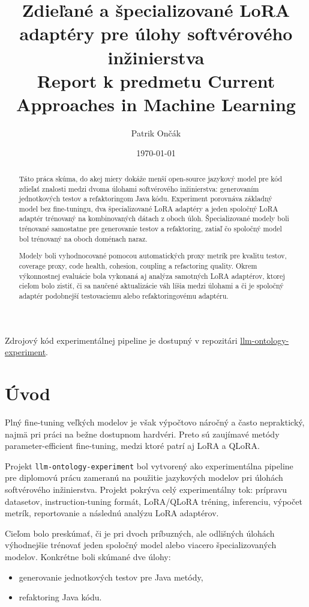 \documentclass[11pt,a4paper]{article}
\title{
\textbf{Zdieľané a špecializované LoRA adaptéry pre úlohy softvérového inžinierstva}\\
\large Report k predmetu Current Approaches in Machine Learning
}
\author{Patrik Ončák}
\date{\today}
\newcommand{\projectname}{\texttt{llm-ontology-experiment}}
\begin{document}
\maketitle

\begin{abstract}
Táto práca skúma, do akej miery dokáže menší open-source jazykový model pre kód zdieľať znalosti medzi dvoma úlohami softvérového inžinierstva: generovaním jednotkových testov a refaktoringom Java kódu. Experiment porovnáva základný model bez fine-tuningu, dva špecializované LoRA adaptéry a jeden spoločný LoRA adaptér trénovaný na kombinovaných dátach z oboch úloh. Špecializované modely boli trénované samostatne pre generovanie testov a refaktoring, zatiaľ čo spoločný model bol trénovaný na oboch doménach naraz.

Modely boli vyhodnocované pomocou automatických proxy metrík pre kvalitu testov, coverage proxy, code health, cohesion, coupling a refactoring quality. Okrem výkonnostnej evaluácie bola vykonaná aj analýza samotných LoRA adaptérov, ktorej cieľom bolo zistiť, či sa naučené aktualizácie váh líšia medzi úlohami a či je spoločný adaptér podobnejší testovaciemu alebo refaktoringovému adaptéru.
\end{abstract}

Zdrojový kód experimentálnej pipeline je dostupný v repozitári
\href{https://github.com/patrik-on/llm-ontology-experiment}{llm-ontology-experiment}.

\section{Úvod}

Plný fine-tuning veľkých modelov je však výpočtovo náročný a často nepraktický, najmä pri práci na bežne dostupnom hardvéri. Preto sú zaujímavé metódy parameter-efficient fine-tuning, medzi ktoré patrí aj LoRA a QLoRA.

Projekt \projectname{} bol vytvorený ako experimentálna pipeline pre diplomovú prácu zameranú na použitie jazykových modelov pri úlohách softvérového inžinierstva. Projekt pokrýva celý experimentálny tok: prípravu datasetov, instruction-tuning formát, LoRA/QLoRA tréning, inferenciu, výpočet metrík, reportovanie a následnú analýzu LoRA adaptérov.

Cieľom bolo preskúmať, či je pri dvoch príbuzných, ale odlišných úlohách výhodnejšie trénovať jeden spoločný model alebo viacero špecializovaných modelov. Konkrétne boli skúmané dve úlohy:
\begin{itemize}
\item generovanie jednotkových testov pre Java metódy,
\item refaktoring Java kódu.
\end{itemize}
\end{document}
